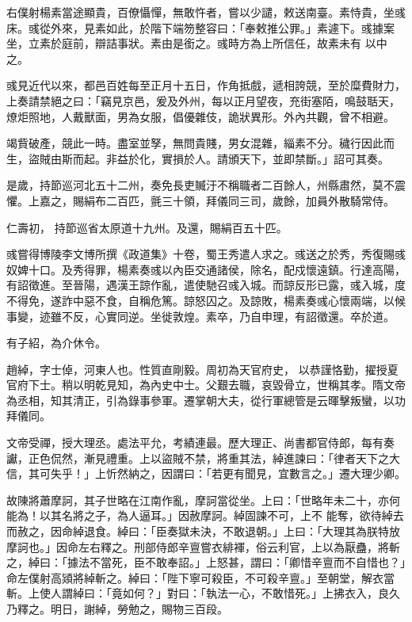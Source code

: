 \begin{pinyinscope}
 右僕射楊素當途顯貴，百僚懾憚，無敢忤者，嘗以少譴，敕送南臺。素恃貴，坐彧床。彧從外來，見素如此，於階下端笏整容曰：「奉敕推公罪。」素遽下。彧據案坐，立素於庭前，辯詰事狀。素由是銜之。彧時方為上所信任，故素未有
 以中之。



 彧見近代以來，都邑百姓每至正月十五日，作角抵戲，遞相誇競，至於糜費財力，上奏請禁絕之曰：「竊見京邑，爰及外州，每以正月望夜，充街塞陌，鳴鼓聒天，燎炬照地，人戴獸面，男為女服，倡優雜伎，詭狀異形。外內共觀，曾不相避。



 竭貲破產，競此一時。盡室並孥，無問貴賤，男女混雜，緇素不分。穢行因此而生，盜賊由斯而起。非益於化，實損於人。請頒天下，並即禁斷。」詔可其奏。



 是歲，持節巡河北五十二州，奏免長吏贓汙不稱職者二百餘人，州縣肅然，莫不震懼。上嘉之，賜絹布二百匹，氈三十領，拜儀同三司，歲餘，加員外散騎常侍。



 仁壽初，
 持節巡省太原道十九州。及還，賜絹百五十匹。



 彧嘗得博陵李文博所撰《政道集》十卷，蜀王秀遣人求之。彧送之於秀，秀復賜彧奴婢十口。及秀得罪，楊素奏彧以內臣交通諸侯，除名，配戍懷遠鎮。行達高陽，有詔徵進。至晉陽，遇漢王諒作亂，遣使馳召彧入城。而諒反形已露，彧入城，度不得免，遂詐中惡不食，自稱危篤。諒怒囚之。及諒敗，楊素奏彧心懷兩端，以候事變，迹雖不反，心實同逆。坐徙敦煌。素卒，乃自申理，有詔徵還。卒於道。



 有子紹，為介休令。



 趙綽，字士倬，河東人也。性質直剛毅。周初為天官府史，
 以恭謹恪勤，擢授夏官府下士。稍以明乾見知，為內史中士。父艱去職，哀毀骨立，世稱其孝。隋文帝為丞相，知其清正，引為錄事參軍。遷掌朝大夫，從行軍總管是云暉擊叛蠻，以功拜儀同。



 文帝受禪，授大理丞。處法平允，考績連最。歷大理正、尚書都官侍郎，每有奏讞，正色侃然，漸見禮重。上以盜賊不禁，將重其法，綽進諫曰：「律者天下之大信，其可失乎！」上忻然納之，因謂曰：「若更有聞見，宜數言之。」遷大理少卿。



 故陳將蕭摩訶，其子世略在江南作亂，摩訶當從坐。上曰：「世略年未二十，亦何能為！以其名將之子，為人逼耳。」因赦摩訶。綽固諫不可，上不
 能奪，欲待綽去而赦之，因命綽退食。綽曰：「臣奏獄未決，不敢退朝。」上曰：「大理其為朕特放摩訶也。」因命左右釋之。刑部侍郎辛亶嘗衣緋褌，俗云利官，上以為厭蠱，將斬之，綽曰：「據法不當死，臣不敢奉詔。」上怒甚，謂曰：「卿惜辛亶而不自惜也？」命左僕射高熲將綽斬之。綽曰：「陛下寧可殺臣，不可殺辛亶。」至朝堂，解衣當斬。上使人謂綽曰：「竟如何？」對曰：「執法一心，不敢惜死。」上拂衣入，良久乃釋之。明日，謝綽，勞勉之，賜物三百段。




\end{pinyinscope}
